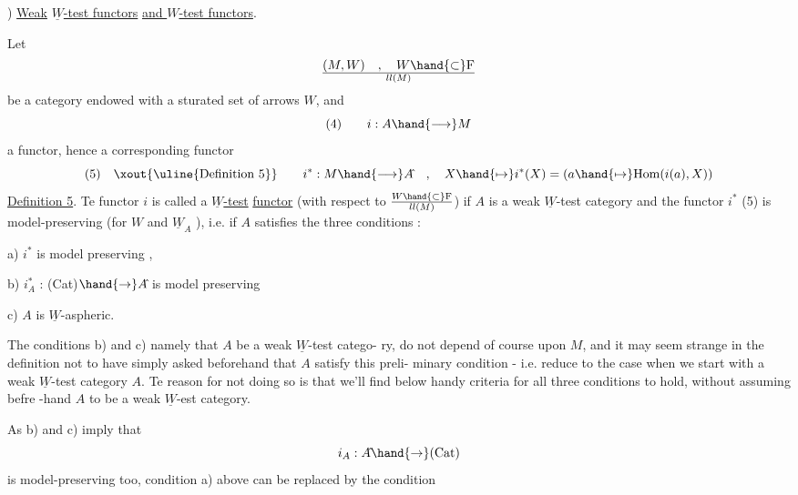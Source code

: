 
) \uline{Weak}  \uline{$\underline{W}$-test functors} \uline{and $W$-test functors}.

Let 
\[ (M,W) \quad , \quad W \hand{\subset} \mathrm{F}\over{l}{l}(M) \]
be a category endowed with a sturated set of arrows $W$, and
\[ (4) \qquad i : A \hand{\longrightarrow} M \]
a functor, hence a corresponding functor
\[ (5) \quad \xout{\text{\uline{Definition 5}}} \qquad i^* : M \hand{\longrightarrow} A\hat{} \quad , \quad X \hand{\mapsto} i^*(X) = (a \hand{\mapsto} \mathrm{Hom}(i(a),X)) \]
\uline{Definition 5}. Te functor $i$ is called a  \uline{$\underline{W}$-test} \uline{functor} (with respect to 
$W \hand{\subset} \mathrm{F}\over{l}{l}(M)$) if  $A$ is a weak $\underline{W}$-test category\hand{,}
and the functor $i^*$ (5) is model-preserving (for $W$ and $\underline{W}_A$ ), i.e. if
$A$ satisfies the three conditions :

a) $i^*$ is model preserving ,

b) $i^*_A$ : (Cat)$\hand{\rightarrow} A\hat{}$ is model preserving\hand{,}

c) $A$ is $\underline{W}$-aspheric.

The conditions b) and c) namely that $A$ be a weak  $\underline{W}$-test catego-%
ry, do not depend of course upon $M$, and it may seem strange in the
definition not to have simply asked beforehand that $A$ satisfy this preli-%
minary condition - i.e. reduce to the case when we start with a weak
$\underline{W}$-test category $A$. Te reason for not doing so is that we'll find below
handy criteria for all three conditions to hold, without assuming befre
-hand $A$ to be a weak $\underline{W}$-est category.

As b) and c) imply that
\[ i_A : A\hat{} \hand{\rightarrow} (\mathrm{Cat}) \]
is model-preserving too, condition a) above can be replaced by the
condition

